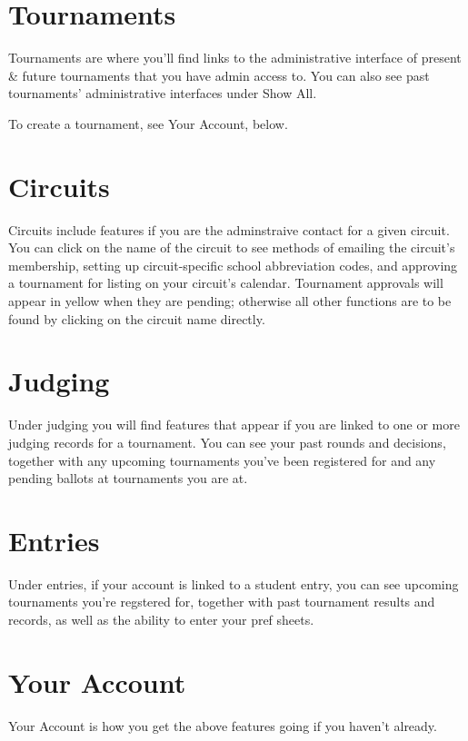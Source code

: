 \documentclass[12pt]{report}
\begin{document}
	\section{Tournaments}

		Tournaments are where you'll find links to the administrative interface
		of present \& future tournaments that you have admin access to.  You
		can also see past tournaments' administrative interfaces under Show
		All.  

		To create a tournament, see Your Account, below.

	\section{Circuits}

		Circuits include features if you are the adminstraive contact for a
		given circuit.  You can click on the name of the circuit to see methods
		of emailing the circuit's membership, setting up circuit-specific
		school abbreviation codes, and approving a tournament for listing on
		your circuit's calendar.  Tournament approvals will appear in yellow
		when they are pending; otherwise all other functions are to be found by
		clicking on the circuit name directly.

	\section{Judging}

		Under judging you will find features that appear if you are linked to
		one or more judging records for a tournament.  You can see your past
		rounds and decisions, together with any upcoming tournaments you've
		been registered for and any pending ballots at tournaments you are at.

	\section{Entries}

		Under entries, if your account is linked to a student entry, you can
		see upcoming tournaments you're regstered for, together with past
		tournament results and records, as well as the ability to enter your
		pref sheets.

	\section{Your Account}

		Your Account is how you get the above features going if you haven't
		already.
\end{document}
